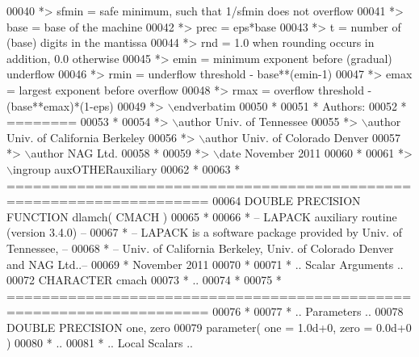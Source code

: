 \begin{DoxyCode}
00040 \textcolor{comment}{*>          sfmin = safe minimum, such that 1/sfmin does not overflow}
00041 \textcolor{comment}{*>          base  = base of the machine}
00042 \textcolor{comment}{*>          prec  = eps*base}
00043 \textcolor{comment}{*>          t     = number of (base) digits in the mantissa}
00044 \textcolor{comment}{*>          rnd   = 1.0 when rounding occurs in addition, 0.0 otherwise}
00045 \textcolor{comment}{*>          emin  = minimum exponent before (gradual) underflow}
00046 \textcolor{comment}{*>          rmin  = underflow threshold - base**(emin-1)}
00047 \textcolor{comment}{*>          emax  = largest exponent before overflow}
00048 \textcolor{comment}{*>          rmax  = overflow threshold  - (base**emax)*(1-eps)}
00049 \textcolor{comment}{*> \(\backslash\)endverbatim}
00050 \textcolor{comment}{*}
00051 \textcolor{comment}{*  Authors:}
00052 \textcolor{comment}{*  ========}
00053 \textcolor{comment}{*}
00054 \textcolor{comment}{*> \(\backslash\)author Univ. of Tennessee }
00055 \textcolor{comment}{*> \(\backslash\)author Univ. of California Berkeley }
00056 \textcolor{comment}{*> \(\backslash\)author Univ. of Colorado Denver }
00057 \textcolor{comment}{*> \(\backslash\)author NAG Ltd. }
00058 \textcolor{comment}{*}
00059 \textcolor{comment}{*> \(\backslash\)date November 2011}
00060 \textcolor{comment}{*}
00061 \textcolor{comment}{*> \(\backslash\)ingroup auxOTHERauxiliary}
00062 \textcolor{comment}{*}
00063 \textcolor{comment}{*  =====================================================================}
00064 \textcolor{keyword}{      DOUBLE PRECISION }\textcolor{keyword}{FUNCTION }dlamch( CMACH )
00065 \textcolor{comment}{*}
00066 \textcolor{comment}{*  -- LAPACK auxiliary routine (version 3.4.0) --}
00067 \textcolor{comment}{*  -- LAPACK is a software package provided by Univ. of Tennessee,    --}
00068 \textcolor{comment}{*  -- Univ. of California Berkeley, Univ. of Colorado Denver and NAG Ltd..--}
00069 \textcolor{comment}{*     November 2011}
00070 \textcolor{comment}{*}
00071 \textcolor{comment}{*     .. Scalar Arguments ..}
00072       \textcolor{keywordtype}{CHARACTER}          cmach
00073 \textcolor{comment}{*     ..}
00074 \textcolor{comment}{*}
00075 \textcolor{comment}{* =====================================================================}
00076 \textcolor{comment}{*}
00077 \textcolor{comment}{*     .. Parameters ..}
00078       \textcolor{keywordtype}{DOUBLE PRECISION}   one, zero
00079       parameter( one = 1.0d+0, zero = 0.0d+0 )
00080 \textcolor{comment}{*     ..}
00081 \textcolor{comment}{*     .. Local Scalars ..}

\end{DoxyCode}
